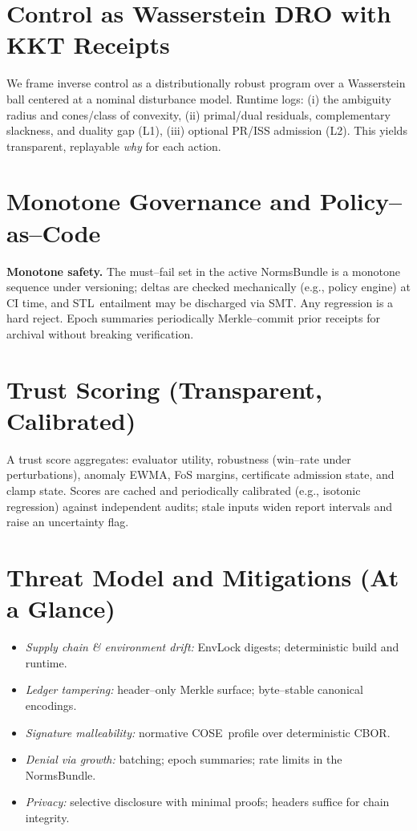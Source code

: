 \documentclass[11pt]{article}
\theoremstyle{plain}
\theoremstyle{definition}
\theoremstyle{remark}
\newcommand{\cose}{\textsc{COSE}}
\newcommand{\cbor}{\textsc{CBOR}}
\newcommand{\stl}{\textsc{STL}}
\newcommand{\smt}{\textsc{SMT}}
\begin{document}
\section{Control as Wasserstein DRO with KKT Receipts}
We frame inverse control as a distributionally robust program over a Wasserstein ball centered at a nominal disturbance model. Runtime logs:
(i) the ambiguity radius and cones/class of convexity,
(ii) primal/dual residuals, complementary slackness, and duality gap (L1),
(iii) optional PR/ISS admission (L2).
This yields transparent, replayable \emph{why} for each action.

\section{Monotone Governance and Policy--as--Code}
\textbf{Monotone safety.} The must--fail set in the active NormsBundle is a monotone sequence under versioning; deltas are checked mechanically (e.g., policy engine) at CI time, and \stl\ entailment may be discharged via \smt. Any regression is a hard reject. Epoch summaries periodically Merkle--commit prior receipts for archival without breaking verification.

\section{Trust Scoring (Transparent, Calibrated)}
A trust score aggregates: evaluator utility, robustness (win--rate under perturbations), anomaly EWMA, FoS margins, certificate admission state, and clamp state. Scores are cached and periodically calibrated (e.g., isotonic regression) against independent audits; stale inputs widen report intervals and raise an uncertainty flag.

\section{Threat Model and Mitigations (At a Glance)}
\begin{itemize}[leftmargin=1.3em]
  \item \emph{Supply chain \& environment drift:} EnvLock digests; deterministic build and runtime.
  \item \emph{Ledger tampering:} header--only Merkle surface; byte--stable canonical encodings.
  \item \emph{Signature malleability:} normative \cose\ profile over deterministic \cbor.
  \item \emph{Denial via growth:} batching; epoch summaries; rate limits in the NormsBundle.
  \item \emph{Privacy:} selective disclosure with minimal proofs; headers suffice for chain integrity.
\end{itemize}
\end{document}
